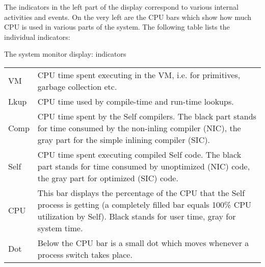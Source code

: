 \documentclass[letterpaper,10pt,english]{sphinxmanual}
\begin{document}
The indicators in the left part of the display correspond to various internal activities and events. On
the very left are the CPU bars which show how much CPU is used in various parts of the system.
The following table lists the individual indicators:


\begin{threeparttable}
\capstart\caption{The system monitor display: indicators}\label{\detokenize{monitor:id1}}
\noindent\begin{tabulary}{\linewidth}{p{5cm} p{10cm}}
\hline
{}\relax &\relax \\
\hline
VM
&
CPU time spent executing in the VM, i.e. for primitives, garbage collection etc.
\\
\hline
Lkup
&
CPU time used by compile-time and run-time lookups.
\\
\hline
Comp
&
CPU time spent by the Self compilers. The black part stands for time consumed by the non-inling
compiler (NIC), the gray part for the simple inlining compiler (SIC).
\\
\hline
Self
&
CPU time spent executing compiled Self code. The black part stands for time consumed by
unoptimized (NIC) code, the gray part for optimized (SIC) code.
\\
\hline
CPU
&
This bar displays the percentage of the CPU that the Self process is getting (a completely filled
bar equals 100\% CPU utilization by Self). Black stands for user time, gray for system time.
\\
\hline
Dot
&
Below the CPU bar is a small dot which moves whenever a process switch takes place.
\\
\hline\end{tabulary}

\end{threeparttable}
\end{document}
